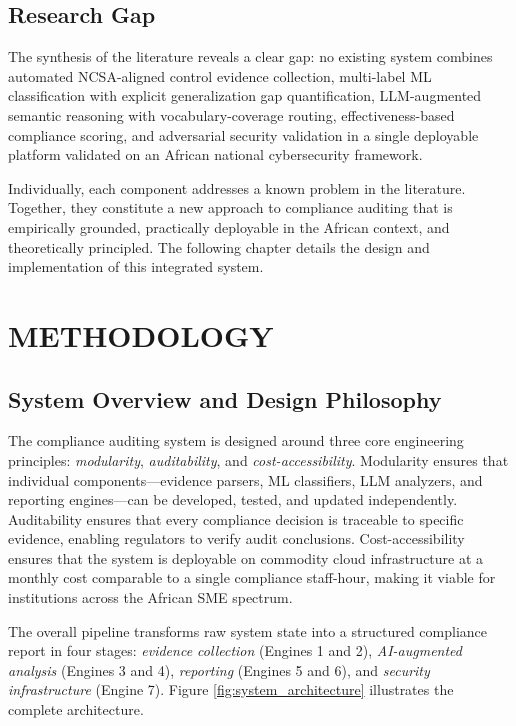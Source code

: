 \documentclass[12pt,oneside]{report}
\begin{document}
\section{Research Gap}

The synthesis of the literature reveals a clear gap: no existing system combines automated NCSA-aligned control evidence collection, multi-label ML classification with explicit generalization gap quantification, LLM-augmented semantic reasoning with vocabulary-coverage routing, effectiveness-based compliance scoring, and adversarial security validation in a single deployable platform validated on an African national cybersecurity framework.

Individually, each component addresses a known problem in the literature. Together, they constitute a new approach to compliance auditing that is empirically grounded, practically deployable in the African context, and theoretically principled. The following chapter details the design and implementation of this integrated system.


\chapter{METHODOLOGY}

\section{System Overview and Design Philosophy}

The compliance auditing system is designed around three core engineering principles: \textit{modularity}, \textit{auditability}, and \textit{cost-accessibility}. Modularity ensures that individual components—evidence parsers, ML classifiers, LLM analyzers, and reporting engines—can be developed, tested, and updated independently. Auditability ensures that every compliance decision is traceable to specific evidence, enabling regulators to verify audit conclusions. Cost-accessibility ensures that the system is deployable on commodity cloud infrastructure at a monthly cost comparable to a single compliance staff-hour, making it viable for institutions across the African SME spectrum.

The overall pipeline transforms raw system state into a structured compliance report in four stages: \textit{evidence collection} (Engines 1 and 2), \textit{AI-augmented analysis} (Engines 3 and 4), \textit{reporting} (Engines 5 and 6), and \textit{security infrastructure} (Engine 7). Figure \ref{fig:system_architecture} illustrates the complete architecture.
\end{document}
